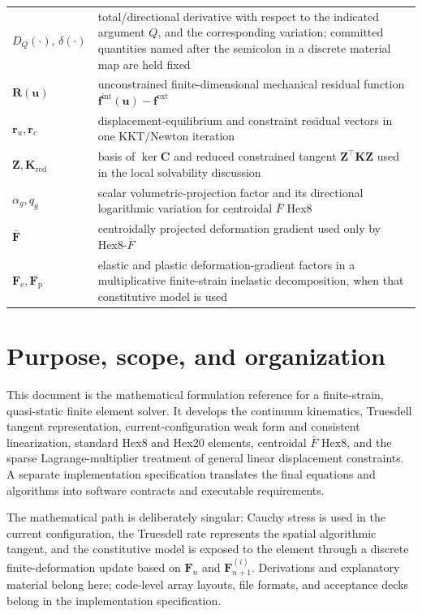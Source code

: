 \documentclass[11pt,a4paper]{article}
\newcommand{\bs}[1]{\boldsymbol{#1}}
\newcommand{\Fe}{\bs{F}_{\mathrm e}}
\newcommand{\Fp}{\bs{F}_{\mathrm p}}
\newcommand{\vct}[1]{\mathbf{#1}}
\begin{document}
\begin{longtable}{>{\raggedright\arraybackslash}p{3.0cm}>{\raggedright\arraybackslash}p{10.8cm}}
$D_Q(\cdot),\,\delta(\cdot)$ & total/directional derivative with respect to the indicated argument $Q$, and the corresponding variation; committed quantities named after the semicolon in a discrete material map are held fixed \\
$\vct R(\vct u)$ & unconstrained finite-dimensional mechanical residual function $\vct f^{\mathrm{int}}(\vct u)-\vct f^{\mathrm{ext}}$ \\
$\vct r_u,\vct r_c$ & displacement-equilibrium and constraint residual vectors in one KKT/Newton iteration \\
$\vct Z,\vct K_{\mathrm{red}}$ & basis of $\ker\vct C$ and reduced constrained tangent $\vct Z^\top\vct K\vct Z$ used in the local solvability discussion \\
$\alpha_g,q_g$ & scalar volumetric-projection factor and its directional logarithmic variation for centroidal $\bar F$ Hex8 \\
$\bar{\bs F}$ & centroidally projected deformation gradient used only by Hex8-$\bar F$ \\
$\Fe,\Fp$ & elastic and plastic deformation-gradient factors in a multiplicative finite-strain inelastic decomposition, when that constitutive model is used \\
\bottomrule
\end{longtable}

\section{Purpose, scope, and organization}
\label{sec:purpose}

This document is the mathematical formulation reference for a finite-strain, quasi-static finite element solver. It develops the continuum kinematics, Truesdell tangent representation, current-configuration weak form and consistent linearization, standard Hex8 and Hex20 elements, centroidal $\bar F$ Hex8, and the sparse Lagrange-multiplier treatment of general linear displacement constraints. A separate implementation specification translates the final equations and algorithms into software contracts and executable requirements.

The mathematical path is deliberately singular: Cauchy stress is used in the current configuration, the Truesdell rate represents the spatial algorithmic tangent, and the constitutive model is exposed to the element through a discrete finite-deformation update based on $\bs F_n$ and $\bs F_{n+1}^{(i)}$. Derivations and explanatory material belong here; code-level array layouts, file formats, and acceptance decks belong in the implementation specification.
\end{document}
